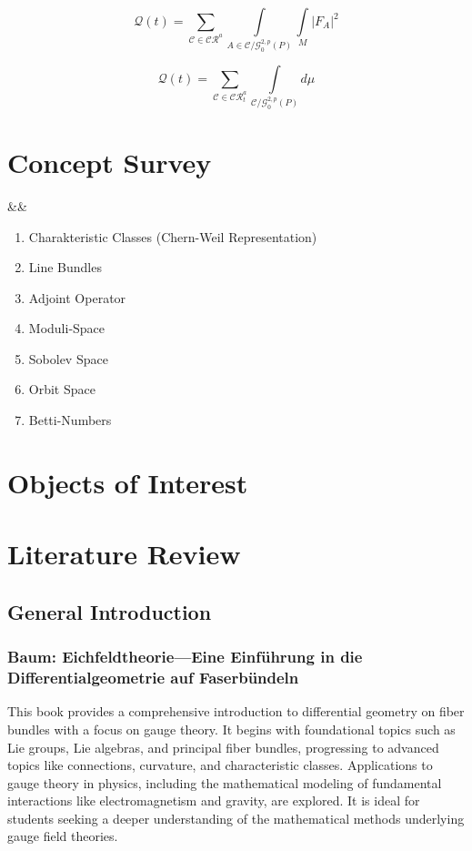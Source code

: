 \documentclass[10pt, letterpaper]{article}
\newenvironment{romanenum}[1][]
  {%
    \ifx&#1&%
    \else
      \textbf{#1}\quad %
    \fi
    \begin{enumerate}[label=\roman*)] %
  }
  {%
    \end{enumerate}%
  }
\theoremstyle{custom}
\theoremstyle{definition}
\begin{document}
$$\mathcal{Q}(t)=\sum\limits_{\mathcal{C}\in\mathcal{CR}^a}\int\limits_{A\in\mathcal{C}/\mathcal{G}_0^{2,p}(P)}\int\limits_{M}|F_A|^2$$

$$\mathcal{Q}(t)=\sum\limits_{\mathcal{C}\in\mathcal{CR}^a_t}\int\limits_{\mathcal{C}/\mathcal{G}_0^{2,p}(P)}d\mu$$


\vspace{1cm}

\section{Concept Survey}


\begin{romanenum}
    \item Charakteristic Classes (Chern-Weil Representation)
    \item Line Bundles
    \item Adjoint Operator
    \item Moduli-Space
    \item Sobolev Space
    \item Orbit Space
    \item Betti-Numbers
\end{romanenum}




\section{Objects of Interest}





\section{Literature Review}





\subsection{General Introduction}

\subsubsection{Baum: Eichfeldtheorie—Eine Einführung in die Differentialgeometrie auf Faserbündeln \cite{baum2014eichfeld}} 
This book provides a comprehensive introduction to differential geometry on fiber bundles with a focus on gauge theory. It begins with foundational topics such as Lie groups, Lie algebras, and principal fiber bundles, progressing to advanced topics like connections, curvature, and characteristic classes. Applications to gauge theory in physics, including the mathematical modeling of fundamental interactions like electromagnetism and gravity, are explored. It is ideal for students seeking a deeper understanding of the mathematical methods underlying gauge field theories.
\end{document}
